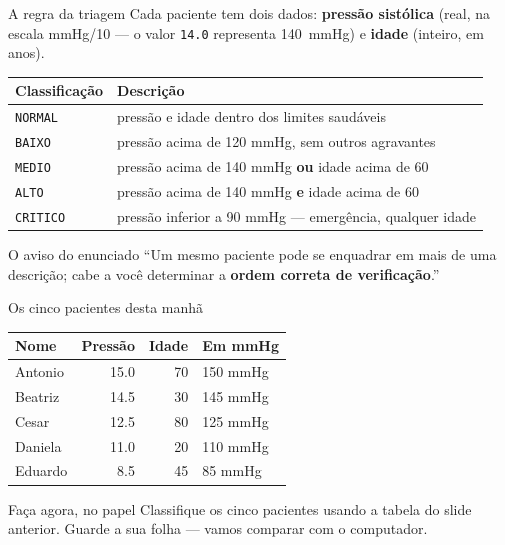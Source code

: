 \documentclass[aspectratio=169]{beamer}
\newcommand{\code}[1]{\texttt{\small #1}}
\begin{document}
\begin{frame}{A regra da triagem}
  Cada paciente tem dois dados: \textbf{pressão sistólica}
  (real, na escala mmHg/10 --- o valor \code{14.0} representa 140~mmHg)
  e \textbf{idade} (inteiro, em anos).

  \vspace{0.25cm}
  \begin{center}
  \scriptsize
  \begin{tabular}{@{}ll@{}}
    \toprule
    \textbf{Classificação} & \textbf{Descrição} \\
    \midrule
    \code{NORMAL}  & pressão e idade dentro dos limites saudáveis \\
    \code{BAIXO}   & pressão acima de 120 mmHg, sem outros agravantes \\
    \code{MEDIO}   & pressão acima de 140 mmHg \textbf{ou} idade acima de 60 \\
    \code{ALTO}    & pressão acima de 140 mmHg \textbf{e} idade acima de 60 \\
    \code{CRITICO} & pressão inferior a 90 mmHg --- emergência, qualquer idade \\
    \bottomrule
  \end{tabular}
  \end{center}

  \vspace{0.15cm}
  \begin{alertblock}{O aviso do enunciado}
    ``Um mesmo paciente pode se enquadrar em mais de uma descrição;
    cabe a você determinar a \textbf{ordem correta de verificação}.''
  \end{alertblock}
\end{frame}

\begin{frame}{Os cinco pacientes desta manhã}
  \begin{center}
  \begin{tabular}{@{}lrrl@{}}
    \toprule
    \textbf{Nome} & \textbf{Pressão} & \textbf{Idade} & \textbf{Em mmHg} \\
    \midrule
    Antonio & 15.0 & 70 & 150 mmHg \\
    Beatriz & 14.5 & 30 & 145 mmHg \\
    Cesar   & 12.5 & 80 & 125 mmHg \\
    Daniela & 11.0 & 20 & 110 mmHg \\
    Eduardo &  8.5 & 45 &  85 mmHg \\
    \bottomrule
  \end{tabular}
  \end{center}

  \vspace{0.35cm}
  \begin{block}{Faça agora, no papel}
    Classifique os cinco pacientes usando a tabela do slide anterior.
    Guarde a sua folha --- vamos comparar com o computador.
  \end{block}
\end{frame}
\end{document}
